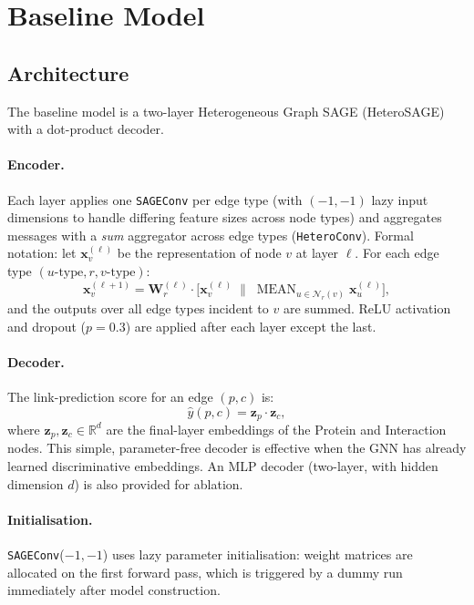 \section{Baseline Model}
\label{app:baseline}

\subsection{Architecture}

The baseline model is a two-layer Heterogeneous Graph SAGE
(HeteroSAGE)~\cite{Hamilton2017} with a dot-product decoder.

\paragraph{Encoder.}
Each layer applies one \texttt{SAGEConv} per edge type (with $(-1, -1)$ lazy
input dimensions to handle differing feature sizes across node types) and
aggregates messages with a \emph{sum} aggregator across edge types
(\texttt{HeteroConv}).
Formal notation: let $\mathbf{x}_v^{(\ell)}$ be the representation of node
$v$ at layer $\ell$.
For each edge type $(u\text{-type}, r, v\text{-type})$:
\begin{equation}
  \mathbf{x}_v^{(\ell+1)}
  = \mathbf{W}^{(\ell)}_r \cdot
    \bigl[\mathbf{x}_v^{(\ell)} \;\|\; \operatorname{MEAN}_{u \in \mathcal{N}_r(v)}
    \mathbf{x}_u^{(\ell)}\bigr],
\end{equation}
and the outputs over all edge types incident to $v$ are summed.
ReLU activation and dropout ($p = 0.3$) are applied after each layer except
the last.

\paragraph{Decoder.}
The link-prediction score for an edge $(p, c)$ is:
\begin{equation}
  \hat{y}(p, c) = \mathbf{z}_p \cdot \mathbf{z}_c,
\end{equation}
where $\mathbf{z}_p, \mathbf{z}_c \in \mathbb{R}^d$ are the final-layer
embeddings of the Protein and Interaction nodes.
This simple, parameter-free decoder is effective when the GNN has already
learned discriminative embeddings.
An MLP decoder (two-layer, with hidden dimension $d$) is also provided for
ablation.

\paragraph{Initialisation.}
\texttt{SAGEConv}($-1, -1$) uses lazy parameter initialisation:
weight matrices are allocated on the first forward pass, which is triggered
by a dummy run immediately after model construction.

